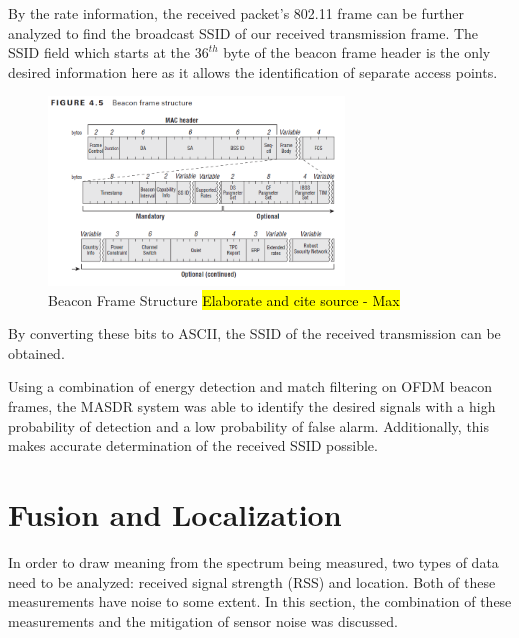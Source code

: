By the rate information, the received packet's 802.11 frame can be further analyzed to find the broadcast SSID of our received transmission frame. The SSID field which starts at the $36^{th}$ byte of the beacon frame header is the only desired information here as it allows the identification of separate access points.
\begin{figure}[ht!]
	\centering
	\includegraphics[width=0.70\textwidth]{img/beacon_frame}
	\caption{Beacon Frame Structure \hl{Elaborate and cite source - Max}}
	\label{fig:beacon_frame}
\end{figure}\par
By converting these bits to ASCII, the SSID of the received transmission can be obtained. \par

Using a combination of energy detection and match filtering on OFDM beacon frames, the MASDR system was able to identify the desired signals with a high probability of detection and a low probability of false alarm. Additionally, this makes accurate determination of the received SSID possible.

\section{Fusion and Localization} \label{methods:kf}
In order to draw meaning from the spectrum being measured, two types of data need to be analyzed: received signal strength (RSS) and location. Both of these measurements have noise to some extent. In this section, the combination of these measurements and the mitigation of sensor noise was discussed. \par  

